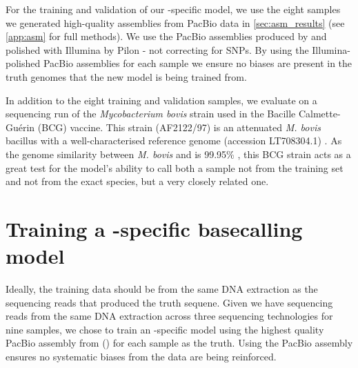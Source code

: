 For the training and validation of our \mtb{}-specific model, we use the eight samples we generated high-quality assemblies from PacBio data in \autoref{sec:asm_results} (see \autoref{app:asm} for full methods). We use the PacBio assemblies produced by \flye{} and polished with Illumina by Pilon - not correcting for SNPs. By using the Illumina-polished PacBio assemblies for each sample we ensure no \ont{} biases are present in the truth genomes that the new model is being trained from.

In addition to the eight training and validation samples, we evaluate on a \ont{} sequencing run of the \textit{Mycobacterium bovis} strain used in the Bacille Calmette-Guérin (BCG) vaccine. This strain (AF2122/97) is an attenuated \textit{M. bovis} bacillus \cite{luca2013} with a well-characterised reference genome (accession LT708304.1) \cite{Malone2017}. As the genome similarity between \textit{M. bovis} and \mtb{} is 99.95\% \cite{Kanipe2020}, this BCG strain acts as a great test for the model's ability to call both a sample not from the training set and not from the exact species, but a very closely related one.


\section{Training a \mtb{}-specific \ont{} basecalling model}

 Ideally, the training data should be from the same DNA extraction as the sequencing reads that produced the truth sequene. Given we have sequencing reads from the same DNA extraction across three sequencing technologies for nine samples, we chose to train an \mtb{}-specific model using the highest quality PacBio assembly from () for each sample as the truth. Using the PacBio assembly ensures no systematic biases from the \ont{} data are being reinforced.   
 
